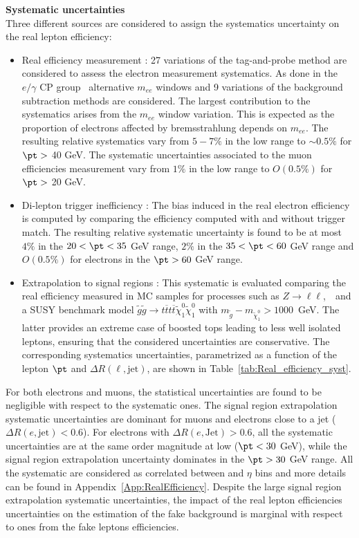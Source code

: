 \par{\bf Systematic uncertainties\\}
Three different sources are considered to assign the systematics uncertainty on the real lepton efficiency: 
\begin{itemize}
	\item Real efficiency measurement : 27 variations of the tag-and-probe method are considered to assess the electron measurement systematics. As done in the $e/\gamma$ CP group~\cite{ATLAS-CONF-2014-032} alternative $m_{ee}$ windows and 9 variations of the background subtraction methods are considered. The largest contribution to the systematics arises from the $m_{ee}$ window variation. This is expected as the proportion of electrons affected by bremsstrahlung depends on $m_{ee}$. The resulting relative systematics vary from $5-7\%$ in the low \pt range to $\sim 0.5\%$ for $\pt >$ 40 GeV. The systematic uncertainties associated to the muon efficiencies measurement vary from $1\%$ in the low \pt range to $O(0.5\%)$ for $\pt >$ 20 GeV.
	\item Di-lepton trigger inefficiency : The bias induced in the real electron efficiency is computed by comparing the efficiency computed with and without trigger match. The resulting relative systematic uncertainty is found to be at most $4\%$ in the $20 < \pt < 35$ GeV range, $2\%$ in the $35 < \pt < 60$ GeV range and $O(0.5\%)$ for electrons in the $\pt > 60$ GeV range.
        \item Extrapolation to signal regions : This systematic is evaluated comparing the real efficiency measured in MC samples for processes such as $Z\to\ell\ell$,~\ttbar\ and a SUSY benchmark model $\tilde{g}\tilde{g} \rightarrow t\overline{t}t\overline{t} \tilde{\chi}^0_1 \tilde{\chi}^0_1$ with $m_{\tilde{g}} - m_{\tilde{\chi}^0_1} > 1000$~GeV. The latter provides an extreme case of boosted tops leading to less well isolated leptons, ensuring that the considered uncertainties are conservative. The corresponding systematics uncertainties, parametrized as a function of the lepton $\pt$ and $\Delta R(\ell,\text{jet})$, are shown in Table~\ref{tab:Real_efficiency_syst}.
\end{itemize}
For both electrons and muons, the statistical uncertainties are found to be negligible with respect to the systematic ones. The signal region extrapolation systematic uncertainties are dominant for muons and electrons close to a jet ($\Delta R(e,\mathrm{jet}) < 0.6$). For electrons with $\Delta R(e,\mathrm{Jet}) > 0.6$, all the systematic uncertainties are at the same order magnitude at low \pt ($\pt < 30$ GeV), while the signal region extrapolation uncertainty dominates in the $\pt > 30$ GeV range. All the systematic are considered as correlated between \pt and $\eta$ bins and more details can be found in Appendix~\ref{App:RealEfficiency}. Despite the large signal region extrapolation systematic uncertainties, the impact of the real lepton efficiencies uncertainties on the estimation of the fake background is marginal with respect to ones from the fake leptons efficiencies.



